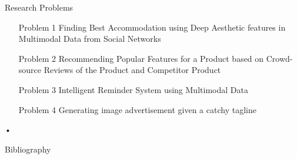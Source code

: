 \documentclass[blue]{beamer}
\begin{document}
\begin{frame}{Research Problems}
\begin{itemize}
\item [Problem 1] Finding Best Accommodation using Deep Aesthetic features in Multimodal Data from Social Networks

\item [Problem 2] Recommending Popular Features for a Product based on Crowd-source Reviews of the Product and Competitor Product  

\item [Problem 3] Intelligent Reminder System using Multimodal Data

\item [Problem 4] Generating image advertisement given a catchy tagline
%

\end{itemize}•
\end{frame}

%
%
%
%



\begin{frame}[allowframebreaks]{Bibliography}
\fontsize{8pt}{7.2}\selectfont


\end{frame}
\end{document}
